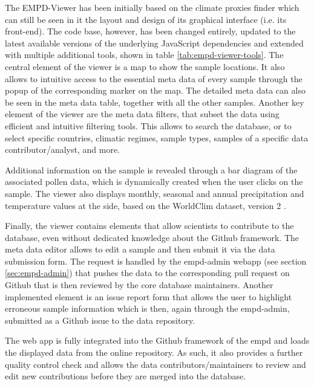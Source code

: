 \begin{refsection}
The EMPD-Viewer has been initially based on the climate proxies finder \citep{BollietBrockmannMassonDelmotteEtAl2016, Brockmann2016} which can still be seen in it the layout and design of its graphical interface (i.e. its front-end). The code base, however, has been changed entirely, updated to the latest available versions of the underlying JavaScript dependencies and extended with multiple additional tools, shown in table \ref{tab:empd-viewer-tools}. The central element of the viewer is a map to show the sample locations. It also allows to intuitive access to the essential meta data of every sample through the popup of the corresponding marker on the map. The detailed meta data can also be seen in the meta data table, together with all the other samples. Another key element of the viewer are the meta data filters, that subset the data using efficient and intuitive filtering tools. This allows to search the database, or to select specific countries, climatic regimes, sample types, samples of a specific data contributor/analyst, and more.

Additional information on the sample is revealed through a bar diagram of the associated pollen data, which is dynamically created when the user clicks on the sample. The viewer also displays monthly, seasonal and annual precipitation and temperature values at the side, based on the WorldClim dataset, version 2 \citep{FickHijmans2017}.

Finally, the viewer contains elements that allow scientists to contribute to the database, even without dedicated knowledge about the Github framework. The meta data editor allows to edit a sample and then submit it via the data submission form. The request is handled by the \gls{empd}-admin webapp (see section \ref{sec:empd-admin}) that pushes the data to the corresponding pull request on Github that is then reviewed by the core database maintainers. Another implemented element is an issue report form that allows the user to highlight erroneous sample information which is then, again through the \gls{empd}-admin, submitted as a Github issue to the data repository.

The web app is fully integrated into the Github framework of the \gls{empd} and loads the displayed data from the online repository. As such, it also provides a further quality control check and allows the data contributors/maintainers to review and edit new contributions before they are merged into the database.


\end{refsection}
